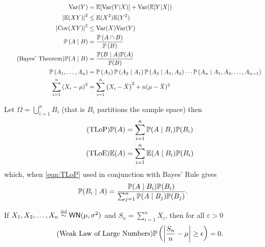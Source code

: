 \begin{align}
    \Var(Y)                                  & = \Em [\Var(Y | X)]+\Var(\Em[Y | X])\vspace{-4mm}                                                                                                              \\
    \left| \Em (X Y) \right|^2               & \leq \Em (X^2) \Em (Y^2)                                                                                                                                       \\
    \left| \Cov (X Y) \right|^2              & \leq \Var (X) \Var (Y)                                                                                                                                         \\
    \Pm \left( A \mid B \right)              & = \frac{\Pm \left( A \cap B \right)}{\Pm \left( B \right)}                                                                                                     \\
    \tag{Bayes' Theorem} \Pm (A \mid B)      & = \frac{\Pm (B \mid A) \Pm (A)}{\Pm (B)}                                                                                                                       \\
    \Pm \left( A_1 , \ldots , A_n \right)    & = \Pm \left( A_1 \right) \Pm \left( A_2 \mid A_1 \right) \Pm \left( A_3 \mid A_1 , A_2 \right) \cdots \Pm \left( A_n \mid A_1 , A_2 , \ldots , A_{n-1} \right) \\
    \sum_{i=1}^{n}\left(X_{i}-\mu\right)^{2} & = \sum_{i=1}^{n}\left(X_{i}-\bar{X}\right)^{2}+n(\mu-\bar{X})^{2}
\end{align}

Let $\Omega = \bigcup\limits_{i=1}^{n} B_{i}$ (that is $B_{i}$ partitions the sample space) then
\begin{align}
    \tag{TLoP} {\mathbb{P}} (A) & = \sum_{i=1}^{n} {\mathbb{P}} (A\mid B_i) {\mathbb{P}} (B_i) \label{eqn:TLoP} \\
    \tag{TLoE} {\mathbb{E}} (A) & = \sum_{i=1}^{n} {\mathbb{E}} (A\mid B_i) {\mathbb{P}} (B_i)
\end{align}
which, when \ref{eqn:TLoP} used in conjunction with Bayes' Rule gives
\begin{equation}
    {\mathbb{P}} (B_i \mid A) = \frac{{\mathbb{P}} (A\mid B_i) {\mathbb{P}} (B_i)}{\sum_{j=1}^{n} {\mathbb{P}} (A\mid B_j) {\mathbb{P}} (B_j)}.
\end{equation}

\vspace{1cm}

If $X_1 , X_2 , \ldots , X_n \overset{\text{iid}}{\sim} {\sf WN} (\mu,\sigma^2)$ and $S_n = \sum_{i=1}^{n} X_i$, then for all $\varepsilon > 0$
\begin{equation}
    \tag{Weak Law of Large Numbers} {\mathbb{P}} \left( \left| \frac{S_n}{n} -\mu \right| \geq \epsilon \right) = 0 .
\end{equation}

